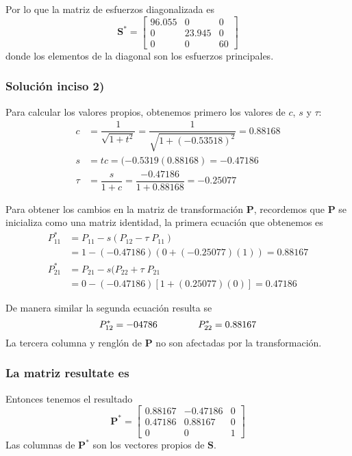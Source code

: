 \begin{frame}
Por lo que la matriz de esfuerzos diagonalizada es
\[ \mathbf{S}^{*} = \begin{bmatrix}
96.055 & 0 & 0 \\
0 & 23.945 & 0 \\
0 &  0 & 60
\end{bmatrix} \]
donde los elementos de la diagonal son los esfuerzos principales.
\end{frame}
\begin{frame}
\frametitle{Solución inciso 2)}
Para calcular los valores propios, obtenemos primero los valores de $c$, $s$ y $\tau$:
\begin{align*}
c &= \dfrac{1}{\sqrt{1 + t^{2}}} = \dfrac{1}{\sqrt{1 + (-0.53518)^{2}}} = 0.88168 \\
s &= tc = (-0.5319(0.88168) = -0.47186 \\
\tau &= \dfrac{s}{1 + c} = \dfrac{-0.47186}{1 + 0.88168} = -0.25077
\end{align*}
\end{frame}
\begin{frame}
Para obtener los cambios en la matriz de transformación $\mathbf{P}$, recordemos que $\mathbf{P}$ se inicializa como una matriz identidad, la primera ecuación que obtenemos es
\[ \begin{split}
P_{11}^{*} &=  P_{11} - s(P_{12} - \tau \; P_{11}) \\
&= 1 - (-0.47186)(0 + (-0.25077)(1)) = 0.88167 \\
P_{21}^{*} &= P_{21} - s(P_{22} + \tau \; P_{21} \\
&= 0 - (-0.47186)[1 + (0.25077)(0)] = 0.47186
\end{split} \]
\end{frame}
\begin{frame}
De manera similar la segunda ecuación resulta se
\[ P_{12}^{*} = -04786 \hspace{1.5cm} P_{22}^{*} = 0.88167 \]
La tercera columna y renglón de $\mathbf{P}$ no son afectadas por la transformación.
\end{frame}
\begin{frame}
\frametitle{La matriz resultate es}
Entonces tenemos el resultado
\[ \mathbf{P}^{*} = \begin{bmatrix}
0.88167 & -0.47186 & 0 \\
0.47186 & 0.88167 & 0 \\
0 & 0 & 1
\end{bmatrix} \]
Las columnas de $\mathbf{P}^{*}$ son los vectores propios de $\mathbf{S}$.
\end{frame}
